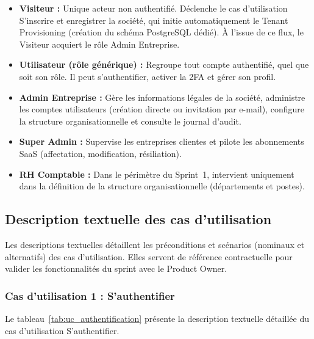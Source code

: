 \begin{itemize}[label=\textbullet, leftmargin=0.6cm]

  \item \textbf{Visiteur :} Unique acteur non authentifié. Déclenche le cas 
  d'utilisation \og{}S'inscrire et enregistrer la société\fg{}, qui initie 
  automatiquement le Tenant Provisioning (création du schéma PostgreSQL dédié). 
  À l'issue de ce flux, le Visiteur acquiert le rôle Admin Entreprise.

  \item \textbf{Utilisateur (rôle générique) :} Regroupe tout compte authentifié, 
  quel que soit son rôle. Il peut s'authentifier, activer la 2FA et gérer son profil.

  \item \textbf{Admin Entreprise :} Gère les informations légales de la société, 
  administre les comptes utilisateurs (création directe ou invitation par e-mail), 
  configure la structure organisationnelle et consulte le journal d'audit.

  \item \textbf{Super Admin :} Supervise les entreprises clientes et pilote les 
  abonnements SaaS (affectation, modification, résiliation).

  \item \textbf{RH Comptable :} Dans le périmètre du Sprint~1, intervient 
  uniquement dans la définition de la structure organisationnelle (départements 
  et postes).

\end{itemize}

\subsection{Description textuelle des cas d'utilisation}
Les descriptions textuelles détaillent les préconditions et scénarios (nominaux et 
alternatifs) des cas d'utilisation. Elles servent de référence contractuelle pour 
valider les fonctionnalités du sprint avec le Product Owner.

\subsubsection{Cas d'utilisation 1 : S'authentifier}
Le tableau~\ref{tab:uc_authentification} présente la description textuelle détaillée 
du cas d'utilisation \og{}S'authentifier\fg{}.

